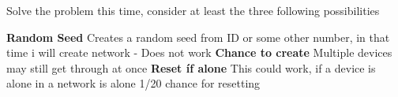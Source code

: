 Solve the problem this time, consider at least the three following possibilities

\textbf{Random Seed}
Creates a random seed from ID or some other number, in that time i will create network - Does not work
\textbf{Chance to create}
Multiple devices may still get through at once
\textbf{Reset íf alone}
This could work, if a device is alone in a network is alone  1/20 chance for resetting